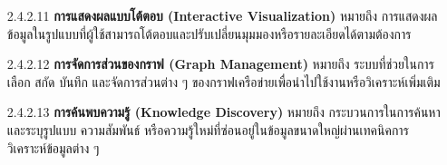 \documentclass[12pt,a4paper]{article}
\begin{document}
\begin{enumerate}[leftmargin=2cm]
{\begin{enumerate}
\begin{enumerate}
                \item[2.4.2.11] \textbf{การแสดงผลแบบโต้ตอบ (Interactive Visualization)} หมายถึง การแสดงผลข้อมูลในรูปแบบที่ผู้ใช้สามารถโต้ตอบและปรับเปลี่ยนมุมมองหรือรายละเอียดได้ตามต้องการ
                \item[2.4.2.12] \textbf{การจัดการส่วนของกราฟ (Graph Management)} หมายถึง ระบบที่ช่วยในการเลือก สกัด บันทึก และจัดการส่วนต่าง ๆ ของกราฟเครือข่ายเพื่อนำไปใช้งานหรือวิเคราะห์เพิ่มเติม
                \item[2.4.2.13] \textbf{การค้นพบความรู้ (Knowledge Discovery)} หมายถึง กระบวนการในการค้นหาและระบุรูปแบบ ความสัมพันธ์ หรือความรู้ใหม่ที่ซ่อนอยู่ในข้อมูลขนาดใหญ่ผ่านเทคนิคการวิเคราะห์ข้อมูลต่าง ๆ
            \end{enumerate}

            \vspace{8cm}


\end{enumerate}}
\end{enumerate}
\end{document}
